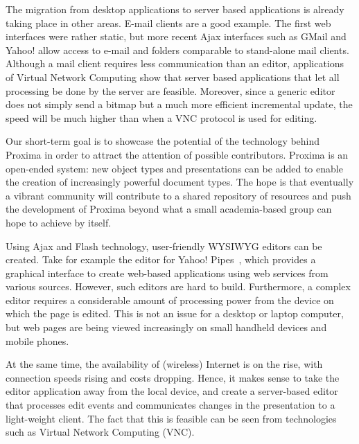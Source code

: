 \documentclass[10pt]{article}
\begin{document}

The migration from desktop applications to server based applications is already taking place in other areas. E-mail clients are a good example. The first web interfaces were rather static, but more recent Ajax interfaces such as GMail and Yahoo! allow access to e-mail and folders comparable to stand-alone mail clients. Although a mail client requires less communication than an editor, applications of Virtual Network Computing show that server based applications that let all processing be done by the server are feasible. Moreover, since a generic editor does not simply send a bitmap but a much more efficient incremental update, the speed will be much higher than when a VNC protocol is used for editing. 

Our short-term goal is to showcase the potential of the technology behind Proxima in order to attract the attention of possible contributors. Proxima is an open-ended system: new object types and presentations can be added to enable the creation of increasingly powerful document types. The hope is that eventually a vibrant community will contribute to a shared repository of resources and push the development of Proxima beyond what a small academia-based group can hope to achieve by itself. 


\bc

Using Ajax and Flash technology, user-friendly WYSIWYG editors can be created. Take for example the editor for Yahoo! Pipes~\cite{yahoo08pipes}, which provides a graphical interface to create web-based applications using web services from various sources. However, such editors are hard to build. Furthermore, a complex editor requires a considerable amount of processing power from the device on which the page is edited. This is not an issue for a desktop or laptop computer, but web pages are being viewed increasingly on small handheld devices and mobile phones. 

At the same time, the availability of (wireless) Internet is on the rise, with connection speeds rising and costs dropping. Hence, it makes sense to take the editor application away from the local device, and create a server-based editor that processes edit events and communicates changes in the presentation to a light-weight client. The fact that this is feasible can be seen from technologies such as Virtual Network Computing (VNC).
\end{document}
